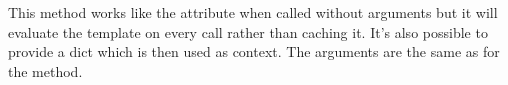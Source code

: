 \documentclass[a4paper,10pt,english]{sphinxmanual}
\begin{document}
\begin{fulllineitems}

\begin{fulllineitems}
\label{api:jinja2.Template.make_module}
This method works like the {\hyperref[api:jinja2.Template.module]{}} attribute when called
without arguments but it will evaluate the template on every call
rather than caching it.  It's also possible to provide
a dict which is then used as context.  The arguments are the same
as for the {\hyperref[api:jinja2.Template.new_context]{}} method.

\end{fulllineitems}


\end{fulllineitems}

\end{document}
